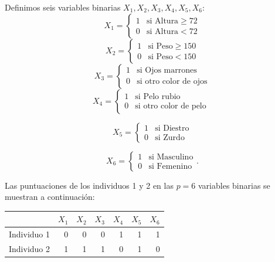 \documentclass[spanish]{beamer}
\begin{document}
\begin{frame}{}
Definimos seis variables binarias $X_1,X_2,X_3,X_4,X_5,X_6$:
$$X_1 = \left \{ \begin{matrix} 1 & \mbox{si Altura}  \geq 72 
\\ 0 & \mbox{si Altura}  < 72 \end{matrix}\right.$$
$$X_2 = \left \{ \begin{matrix} 1 & \mbox{si Peso}  \geq 150 
\\ 0 & \mbox{si Peso}  < 150 \end{matrix}\right.   $$
$$X_3 = \left \{ \begin{matrix} 1 & \mbox{si Ojos marrones} 
\\ 0 & \mbox{si otro color de ojos}\end{matrix}\right.   $$
$$X_4 = \left \{ \begin{matrix} 1 & \mbox{si Pelo rubio} 
\\ 0 & \mbox{si otro color de pelo } \end{matrix}\right.   $$

$$X_5 = \left \{ \begin{matrix} 1 & \mbox{si Diestro} 
\\ 0 & \mbox{si Zurdo } \end{matrix}\right.   $$

$$X_6 = \left \{ \begin{matrix} 1 & \mbox{si Masculino} 
\\ 0 & \mbox{si Femenino}  \end{matrix}\right.   .$$
\end{frame}

\begin{frame}{}
Las puntuaciones de los individuos 1 y 2 en las $p=6$ variables binarias se muestran a continuación:

\begin{table}[h]
  \centering
\resizebox{8cm}{!} {
  \begin{tabular}{lrrrrrr}
    \toprule
            & \multicolumn{1}{l}{$X_1$} & \multicolumn{1}{l}{$X_2$} & \multicolumn{1}{l}{$X_3$} & \multicolumn{1}{l}{$X_4$} & \multicolumn{1}{l}{$X_5$} & \multicolumn{1}{l}{$X_6$} \\ \midrule
Individuo 1 & 0                        & 0                        & 0                        & 1                        & 1                        & 1                        \\
Individuo 2 & 1                        & 1                        & 1                        & 0                        & 1                        & 0\\
\bottomrule
\end{tabular}
}
\end{table}
\end{frame}
\end{document}
